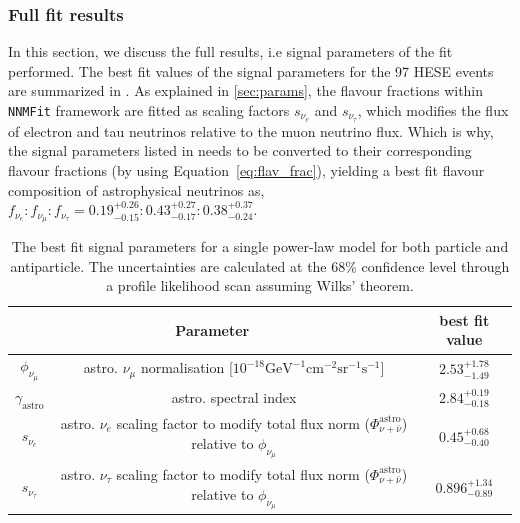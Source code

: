 \subsubsection{Full fit results}
\label{final_fit}
In this section, we discuss the full results, i.e signal parameters of the fit performed. The best fit values of the signal parameters for the 97 HESE events are summarized in . As explained in \ref{sec:params}, the flavour fractions within \texttt{NNMFit} framework are fitted as scaling factors $s_{\nu_{e}}$ and $s_{\nu_{\tau}}$, which modifies the flux of electron and tau neutrinos relative to the muon neutrino flux. Which is why, the signal parameters listed in  needs to be converted to their corresponding flavour fractions (by using Equation~\ref{eq:flav_frac}), yielding a best fit flavour composition of astrophysical neutrinos as, \textbf{$f_{\nu_e}:f_{\nu_{\mu}}:f_{\nu_{\tau}} = 0.19_{-0.15}^{+0.26}:0.43_{-0.17}^{+0.27}:0.38_{-0.24}^{+0.37}$}.

\begin{table}[h]
    \caption[The best fit parameter values of the signal parameters in HESE-12 flavour fit]{The best fit signal parameters for a single power-law model for both particle and antiparticle. The uncertainties are calculated at the 68\% confidence level through a profile likelihood scan assuming Wilks' theorem.}
    {\renewcommand{\arraystretch}{1.4}
    \begin{tabular}{ c c |c}
        
        \hline
        \multicolumn{2}{c|}{Parameter}  & best fit value\\
        \hline
        \hline
        $\phi_{\nu_{\mu}}$ &astro. $\nu_{\mu}$ normalisation [$10^{-18} \mathrm{GeV}^{-1}\mathrm{cm}^{-2}\mathrm{sr}^{-1}\mathrm{s}^{-1}$]& $2.53_{-1.49}^{+1.78}$\\
        \hline
        $\gamma_{\mathrm{astro}}$ &astro. spectral index & $2.84_{-0.18}^{+0.19}$\\
        \hline
        $s_{\nu_e}$ &astro. $\nu_{e}$ scaling factor to modify total flux norm ($\Phi_{\nu+\bar\nu}^{\mathrm{astro}}$) relative to $\phi_{\nu_{\mu}}$ & $0.45_{-0.40}^{+0.68}$\\
        \hline
        $s_{\nu_{\tau}}$ &astro. $\nu_{\tau}$ scaling factor to modify total flux norm ($\Phi_{\nu+\bar\nu}^{\mathrm{astro}}$) relative to $\phi_{\nu_{\mu}}$ & $0.896_{-0.89}^{+1.34}$\\
        \hline
        \hline
    \end{tabular}
    }
\end{table}


